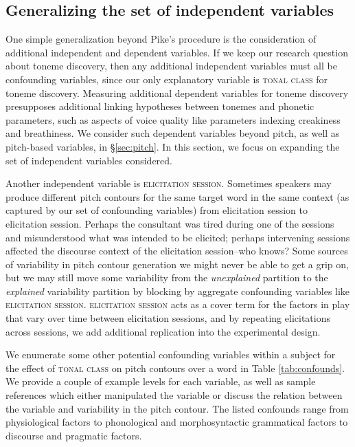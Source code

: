 \documentclass[12pt]{article}
\begin{document}
\subsection{Generalizing the set of independent variables}
\label{sec:gen-iv}

One simple generalization beyond Pike's procedure is the consideration
of additional independent and dependent variables.  If we keep our research question
about toneme discovery, then any additional independent variables must all be
confounding variables, since our only explanatory variable is
\textsc{tonal class} for toneme discovery. Measuring additional dependent
variables for toneme discovery presupposes additional linking
hypotheses between tonemes and phonetic parameters, such as aspects of
voice quality like parameters indexing creakiness and breathiness. We
consider such dependent variables beyond pitch, as well as pitch-based
variables, in \S\ref{sec:pitch}. In this section, we focus on expanding the set
of independent variables considered.

Another independent variable is \textsc{elicitation
session}. Sometimes speakers may produce different pitch contours for
the same target word in the same context (as captured by our set of
confounding variables) from elicitation session to elicitation
session. Perhaps the consultant was tired during one of the sessions
and misunderstood what was intended to be elicited; perhaps
intervening sessions affected the discourse context of the elicitation
session--who knows? Some sources of variability in pitch contour
generation we might never be able to get a grip on, but we may still
move some variability from the \textit{unexplained} partition to the \textit{explained}
variability partition by blocking by aggregate confounding variables like
\textsc{elicitation session}. \textsc{elicitation session} acts as a
cover term for the factors in play that vary over time between
elicitation sessions, and by repeating elicitations across sessions,
we add additional replication into the experimental design. 

We enumerate some other potential confounding variables within a subject for the effect of
\textsc{tonal class} on pitch contours over a word in Table
\ref{tab:confounds}. We provide a couple of example
levels for each variable, as well as sample references which either manipulated the
variable or discuss the relation between the variable and variability
in the pitch contour. The listed confounds range
from physiological factors to phonological and morphosyntactic
grammatical factors to discourse and pragmatic factors. 
\end{document}
